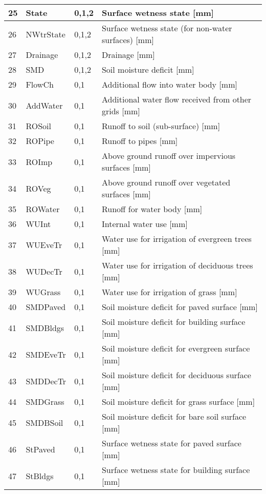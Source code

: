 \documentclass[letterpaper,10pt,english]{sphinxmanual}
\begin{document}
\begin{savenotes}
\begin{longtable}{|l|l|l|l|}
\hline
25
&
State
&
0,1,2
&
Surface wetness state {[}mm{]}
\\
\hline
26
&
NWtrState
&
0,1,2
&
Surface wetness state (for non-water surfaces) {[}mm{]}
\\
\hline
27
&
Drainage
&
0,1,2
&
Drainage {[}mm{]}
\\
\hline
28
&
SMD
&
0,1,2
&
Soil moisture deficit {[}mm{]}
\\
\hline
29
&
FlowCh
&
0,1
&
Additional flow into water body {[}mm{]}
\\
\hline
30
&
AddWater
&
0,1
&
Additional water flow received from other grids {[}mm{]}
\\
\hline
31
&
ROSoil
&
0,1
&
Runoff to soil (sub-surface) {[}mm{]}
\\
\hline
32
&
ROPipe
&
0,1
&
Runoff to pipes {[}mm{]}
\\
\hline
33
&
ROImp
&
0,1
&
Above ground runoff over impervious surfaces {[}mm{]}
\\
\hline
34
&
ROVeg
&
0,1
&
Above ground runoff over vegetated surfaces {[}mm{]}
\\
\hline
35
&
ROWater
&
0,1
&
Runoff for water body {[}mm{]}
\\
\hline
36
&
WUInt
&
0,1
&
Internal water use {[}mm{]}
\\
\hline
37
&
WUEveTr
&
0,1
&
Water use for irrigation of evergreen trees {[}mm{]}
\\
\hline
38
&
WUDecTr
&
0,1
&
Water use for irrigation of deciduous trees {[}mm{]}
\\
\hline
39
&
WUGrass
&
0,1
&
Water use for irrigation of grass {[}mm{]}
\\
\hline
40
&
SMDPaved
&
0,1
&
Soil moisture deficit for paved surface {[}mm{]}
\\
\hline
41
&
SMDBldgs
&
0,1
&
Soil moisture deficit for building surface {[}mm{]}
\\
\hline
42
&
SMDEveTr
&
0,1
&
Soil moisture deficit for evergreen surface {[}mm{]}
\\
\hline
43
&
SMDDecTr
&
0,1
&
Soil moisture deficit for deciduous surface {[}mm{]}
\\
\hline
44
&
SMDGrass
&
0,1
&
Soil moisture deficit for grass surface {[}mm{]}
\\
\hline
45
&
SMDBSoil
&
0,1
&
Soil moisture deficit for bare soil surface {[}mm{]}
\\
\hline
46
&
StPaved
&
0,1
&
Surface wetness state for paved surface {[}mm{]}
\\
\hline
47
&
StBldgs
&
0,1
&
Surface wetness state for building surface {[}mm{]}

\end{longtable}
\end{savenotes}
\end{document}

